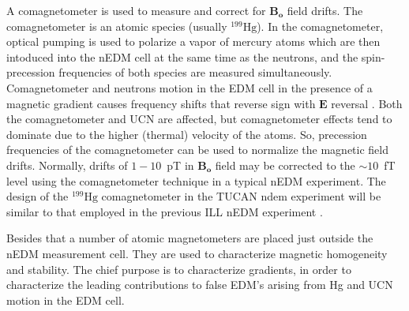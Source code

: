 A comagnetometer is used to measure and correct for  $\bm{B_o}$ field drifts. The comagnetometer is an atomic species (usually $^{199}\text{Hg}$). In the comagnetometer, optical pumping is used to polarize a vapor of mercury atoms  which are then intoduced into the
nEDM cell at the same time as the neutrons, and the spin-precession frequencies of both species are measured simultaneously. Comagnetometer and neutrons motion in the EDM cell in the presence of a magnetic gradient causes frequency shifts that reverse sign with $\bm{E}$ reversal \cite{comag_1,comag_2,comag_3}. Both the comagnetometer and UCN are affected, but comagnetometer effects tend to dominate due to the higher (thermal) velocity of the atoms. So, precession frequencies of the comagnetometer can be used to normalize the magnetic field drifts. Normally, drifts of $1-10$~pT in $\bm{B_o}$ field may be corrected to the $\sim10$~fT level using the comagnetometer technique in a typical nEDM experiment. The design of the $^{199}\mathrm{Hg}$ comagnetometer in the TUCAN ndem experiment will be similar to that employed in the previous ILL nEDM experiment \cite{bestLim_1,comag_4}.


Besides that a number of atomic magnetometers are placed just outside the
nEDM measurement cell. They are used to characterize magnetic homogeneity and stability. The chief purpose is to characterize gradients, in order to characterize the leading contributions to false EDM's arising from Hg and UCN motion in the EDM cell.





